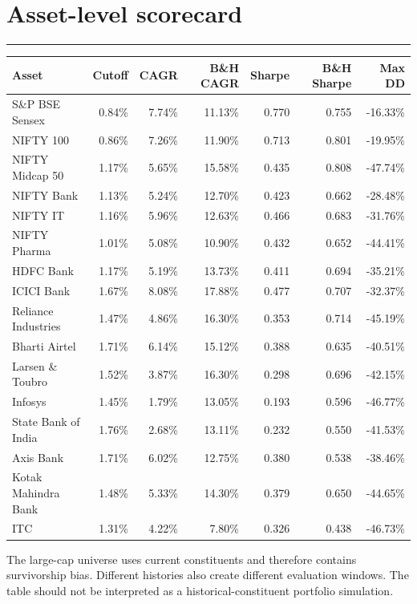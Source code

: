 \documentclass[11pt,a4paper]{article}
\newcommand{\sectionrule}{\vspace{-0.5em}\par\noindent\color{SignalGreen}\rule{\linewidth}{0.7pt}\color{Ink}\par\vspace{0.3em}}
\begin{document}
\section{Asset-level scorecard}
\sectionrule
\scriptsize
\begin{longtable}{p{33mm}rrrrrr}
\toprule
Asset & Cutoff & CAGR & B\&H CAGR & Sharpe & B\&H Sharpe & Max DD \\
\midrule
\endhead
S\&P BSE Sensex & 0.84\% & 7.74\% & 11.13\% & 0.770 & 0.755 & -16.33\% \\
NIFTY 100 & 0.86\% & 7.26\% & 11.90\% & 0.713 & 0.801 & -19.95\% \\
NIFTY Midcap 50 & 1.17\% & 5.65\% & 15.58\% & 0.435 & 0.808 & -47.74\% \\
NIFTY Bank & 1.13\% & 5.24\% & 12.70\% & 0.423 & 0.662 & -28.48\% \\
NIFTY IT & 1.16\% & 5.96\% & 12.63\% & 0.466 & 0.683 & -31.76\% \\
NIFTY Pharma & 1.01\% & 5.08\% & 10.90\% & 0.432 & 0.652 & -44.41\% \\
HDFC Bank & 1.17\% & 5.19\% & 13.73\% & 0.411 & 0.694 & -35.21\% \\
ICICI Bank & 1.67\% & 8.08\% & 17.88\% & 0.477 & 0.707 & -32.37\% \\
Reliance Industries & 1.47\% & 4.86\% & 16.30\% & 0.353 & 0.714 & -45.19\% \\
Bharti Airtel & 1.71\% & 6.14\% & 15.12\% & 0.388 & 0.635 & -40.51\% \\
Larsen \& Toubro & 1.52\% & 3.87\% & 16.30\% & 0.298 & 0.696 & -42.15\% \\
Infosys & 1.45\% & 1.79\% & 13.05\% & 0.193 & 0.596 & -46.77\% \\
State Bank of India & 1.76\% & 2.68\% & 13.11\% & 0.232 & 0.550 & -41.53\% \\
Axis Bank & 1.71\% & 6.02\% & 12.75\% & 0.380 & 0.538 & -38.46\% \\
Kotak Mahindra Bank & 1.48\% & 5.33\% & 14.30\% & 0.379 & 0.650 & -44.65\% \\
ITC & 1.31\% & 4.22\% & 7.80\% & 0.326 & 0.438 & -46.73\% \\
\bottomrule
\end{longtable}
\normalsize

The large-cap universe uses current constituents and therefore contains survivorship bias. Different histories also create different evaluation windows. The table should not be interpreted as a historical-constituent portfolio simulation.
\end{document}
